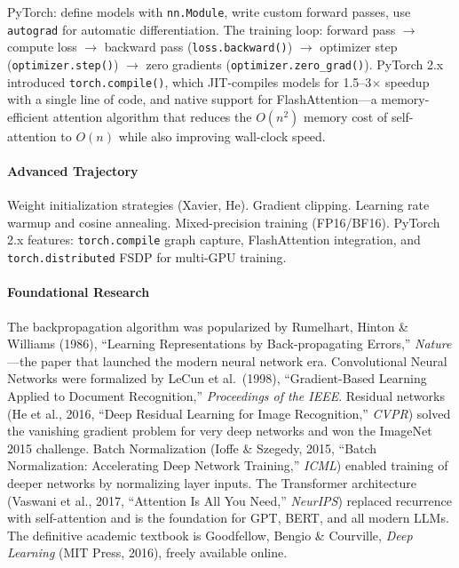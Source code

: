 \documentclass[11pt, a4paper, oneside]{report}
\newcommand{\arrow}{$\rightarrow$}
\begin{document}
PyTorch: define models with \texttt{nn.Module}, write custom forward passes, use \texttt{autograd} for automatic differentiation. The training loop: forward pass \arrow{} compute loss \arrow{} backward pass (\texttt{loss.backward()}) \arrow{} optimizer step (\texttt{optimizer.step()}) \arrow{} zero gradients (\texttt{optimizer.zero\_grad()}). PyTorch 2.x introduced \texttt{torch.compile()}, which JIT-compiles models for 1.5--3$\times$ speedup with a single line of code, and native support for FlashAttention---a memory-efficient attention algorithm that reduces the $O(n^2)$ memory cost of self-attention to $O(n)$ while also improving wall-clock speed.

\paragraph{Advanced Trajectory} Weight initialization strategies (Xavier, He). Gradient clipping. Learning rate warmup and cosine annealing. Mixed-precision training (FP16/BF16). PyTorch 2.x features: \texttt{torch.compile} graph capture, FlashAttention integration, and \texttt{torch.distributed} FSDP for multi-GPU training.


\paragraph{Foundational Research} The backpropagation algorithm was popularized by Rumelhart, Hinton \& Williams (1986), ``Learning Representations by Back-propagating Errors,'' \emph{Nature}---the paper that launched the modern neural network era. Convolutional Neural Networks were formalized by LeCun et al.\ (1998), ``Gradient-Based Learning Applied to Document Recognition,'' \emph{Proceedings of the IEEE}. Residual networks (He et al., 2016, ``Deep Residual Learning for Image Recognition,'' \emph{CVPR}) solved the vanishing gradient problem for very deep networks and won the ImageNet 2015 challenge. Batch Normalization (Ioffe \& Szegedy, 2015, ``Batch Normalization: Accelerating Deep Network Training,'' \emph{ICML}) enabled training of deeper networks by normalizing layer inputs. The Transformer architecture (Vaswani et al., 2017, ``Attention Is All You Need,'' \emph{NeurIPS}) replaced recurrence with self-attention and is the foundation for GPT, BERT, and all modern LLMs. The definitive academic textbook is Goodfellow, Bengio \& Courville, \emph{Deep Learning} (MIT Press, 2016), freely available online.
\end{document}
